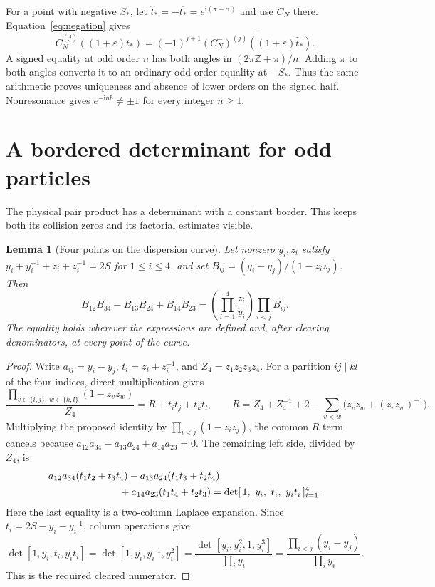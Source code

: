 \documentclass[11pt]{article}
\numberwithin{equation}{section}
\newtheorem{lemma}[theorem]{Lemma}
\theoremstyle{remark}\newtheorem{remark}[theorem]{Remark}
\newcommand{\ii}{\mathrm i}
\begin{document}
For a point with negative $S_*$, let
$\widehat t_*=-\overline{t_*}=e^{\ii(\pi-\alpha)}$ and use
$C_N^-$ there. Equation~\eqref{eq:negation} gives
\begin{equation}\label{eq:negative-derivatives}
 C_N^{(j)}((1+\varepsilon)t_*)
   =(-1)^{j+1}\overline{(C_N^-)^{(j)}((1+\varepsilon)\widehat t_*)}.
\end{equation}
A signed equality at odd order $n$ has both angles in
$(2\pi\mathbb Z+\pi)/n$. Adding $\pi$ to both angles
converts it to an ordinary odd-order equality at $-S_*$.
Thus the same arithmetic proves uniqueness and absence of lower
orders on the signed half. Nonresonance gives
$e^{-\ii nb}\ne\pm1$ for every integer $n\ge1$.

\section{A bordered determinant for odd particles}
\label{sec:elementary-pfaffian}\label{sec:determinant-local}
The physical pair product has a determinant with a constant border.
This keeps both its collision zeros and its factorial estimates visible.
\begin{lemma}[Four points on the dispersion curve]
Let nonzero $y_i,z_i$ satisfy
$y_i+y_i^{-1}+z_i+z_i^{-1}=2S$ for $1\le i\le4$, and set
$B_{ij}=(y_i-y_j)/(1-z_i z_j)$.  Then
\[
 B_{12}B_{34}-B_{13}B_{24}+B_{14}B_{23}
 =\left(\prod_{i=1}^4\frac{z_i}{y_i}\right)
   \prod_{i<j}B_{ij}.
\]
The equality holds wherever the expressions are defined and,
after clearing denominators, at every point of the curve.
\end{lemma}
\begin{proof}
Write $a_{ij}=y_i-y_j$, $t_i=z_i+z_i^{-1}$, and
$Z_4=z_1z_2z_3z_4$.  For a partition $ij\mid kl$ of the four
indices, direct multiplication gives
\[
 \frac{\prod_{v\in\{i,j\},\,w\in\{k,l\}}(1-z_vz_w)}{Z_4}
 =R+t_it_j+t_kt_l,
 \qquad
 R=Z_4+Z_4^{-1}+2-\sum_{v<w}
          \bigl(z_vz_w+(z_vz_w)^{-1}\bigr).
\]
Multiplying the proposed identity by
$\prod_{i<j}(1-z_i z_j)$, the common $R$ term cancels because
$a_{12}a_{34}-a_{13}a_{24}+a_{14}a_{23}=0$.
The remaining left side, divided by $Z_4$, is
\[
 \begin{split}
 &a_{12}a_{34}(t_1t_2+t_3t_4)
 -a_{13}a_{24}(t_1t_3+t_2t_4)\\
 &\hspace{25mm}+a_{14}a_{23}(t_1t_4+t_2t_3)
 =\det[\,1,\ y_i,\ t_i,\ y_it_i\,]_{i=1}^4.
 \end{split}
\]
Here the last equality is a two-column Laplace expansion.
Since $t_i=2S-y_i-y_i^{-1}$, column operations give
\[
 \det[1,y_i,t_i,y_it_i]
 =\det[1,y_i,y_i^{-1},y_i^2]
 =\frac{\det[y_i,y_i^2,1,y_i^3]}{\prod_i y_i}
 =\frac{\prod_{i<j}(y_i-y_j)}{\prod_i y_i}.
\]
This is the required cleared numerator.
\end{proof}
\end{document}

